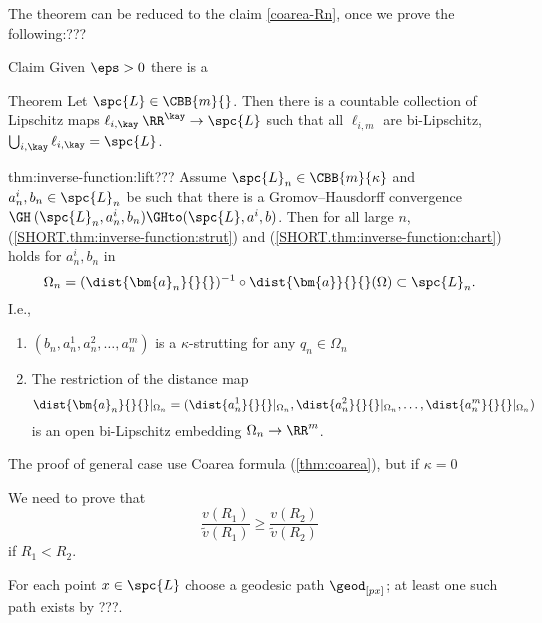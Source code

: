 The theorem can be reduced to the claim \ref{coarea-Rn}, once we prove the following:???

\begin{clm}{Claim}
Given $\eps>0$ there is a 
\end{clm}


\begin{thm}{Theorem}
Let $\spc{L}\in \CBB{m}{}$. 
Then there is a countable collection of Lipschitz maps $\ell_{i,\kay}\:\RR^\kay\to \spc{L}$ such that all $\ell_{i,m}$ are bi-Lipschitz, $\bigcup_{i,\kay}\ell_{i,\kay}=\spc{L}$. 
\end{thm}










\begin{subthm}{thm:inverse-function:lift}???
Assume $\spc{L}_n\in\CBB{m}{\kappa}$ and $a^i_n,b_n\in\spc{L}_n$ be such that there is a Gromov--Hausdorff convergence
$\GH\:(\spc{L}_n, a^i_n,b_n)\GHto(\spc{L},a^i,b)$.
Then for all large $n$,
(\ref{SHORT.thm:inverse-function:strut}) 
and (\ref{SHORT.thm:inverse-function:chart}) 
holds for $a^i_n,b_n$ in 
$$\Omega_n
=
(\dist{\bm{a}_n}{}{})^{-1}\circ\dist{\bm{a}}{}{}(\Omega)
\subset
\spc{L}_n.$$ I.e.,
\begin{enumerate}[a$')$]
\item $(b_n,a^1_n,a^2_n,\dots,a^m_n)$ is a $\kappa$-strutting for any $q_n\in\Omega_n$
\item The restriction of the distance map 
$$\dist{\bm{a}_n}{}{}|_{\Omega_n}
=
(\dist{a^1_n}{}{}|_{\Omega_n},\dist{a^2_n}{}{}|_{\Omega_n},\dots,\dist{a^m_n}{}{}|_{\Omega_n})$$ 
is an open bi-Lipschitz embedding  $\Omega_n\to\RR^m$.
\end{enumerate}





\end{subthm}






The proof of general case use Coarea formula (\ref{thm:coarea}),
but if $\kappa=0$ 

We need to prove that 
$$ \frac{v(R_1)}{\tilde v(R_1)}\ge \frac{v(R_2)}{\tilde v(R_2)}$$
if $R_1< R_2$.

For each point $x\in \spc{L}$ choose a geodesic path $\geod_{[px]}$;
at least one such path exists by ???.


